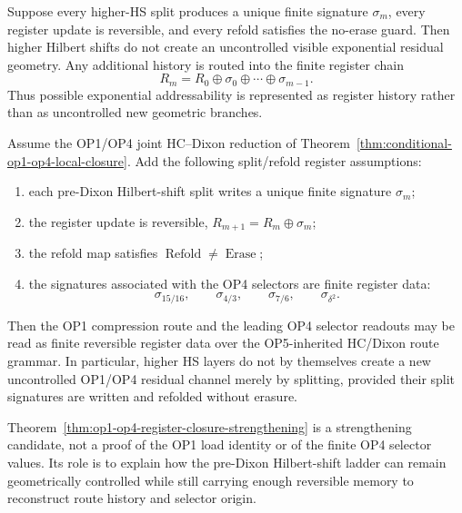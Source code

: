 \begin{lemma}
\label{lem:no-higher-hs-residual-explosion}
Suppose every higher-HS split produces a unique finite signature
\(\sigma_m\), every register update is reversible, and every refold
satisfies the no-erase guard.  Then higher Hilbert shifts do not create
an uncontrolled visible exponential residual geometry.  Any additional
history is routed into the finite register chain
\[
  R_m
  =
  R_0\oplus\sigma_0\oplus\cdots\oplus\sigma_{m-1}.
\]
Thus possible exponential addressability is represented as register
history rather than as uncontrolled new geometric branches.
\end{lemma}

\begin{theorem}
\label{thm:op1-op4-register-closure-strengthening}
Assume the OP1/OP4 joint HC--Dixon reduction of
Theorem~\ref{thm:conditional-op1-op4-local-closure}.  Add the following
split/refold register assumptions:
\begin{enumerate}
  \item each pre-Dixon Hilbert-shift split writes a unique finite
  signature \(\sigma_m\);
  \item the register update is reversible,
  \(R_{m+1}=R_m\oplus\sigma_m\);
  \item the refold map satisfies \(\operatorname{Refold}\neq
  \operatorname{Erase}\);
  \item the signatures associated with the OP4 selectors are finite
  register data:
  \[
    \sigma_{15/16},\qquad
    \sigma_{4/3},\qquad
    \sigma_{7/6},\qquad
    \sigma_{\delta^2}.
  \]
\end{enumerate}
Then the OP1 compression route and the leading OP4 selector readouts may
be read as finite reversible register data over the OP5-inherited
HC/Dixon route grammar.  In particular, higher HS layers do not by
themselves create a new uncontrolled OP1/OP4 residual channel merely by
splitting, provided their split signatures are written and refolded
without erasure.
\end{theorem}

\begin{remark}
\label{rem:register-strengthening-status}
Theorem~\ref{thm:op1-op4-register-closure-strengthening} is a
strengthening candidate, not a proof of the OP1 load identity or of the
finite OP4 selector values.  Its role is to explain how the pre-Dixon
Hilbert-shift ladder can remain geometrically controlled while still
carrying enough reversible memory to reconstruct route history and
selector origin.
\end{remark}

